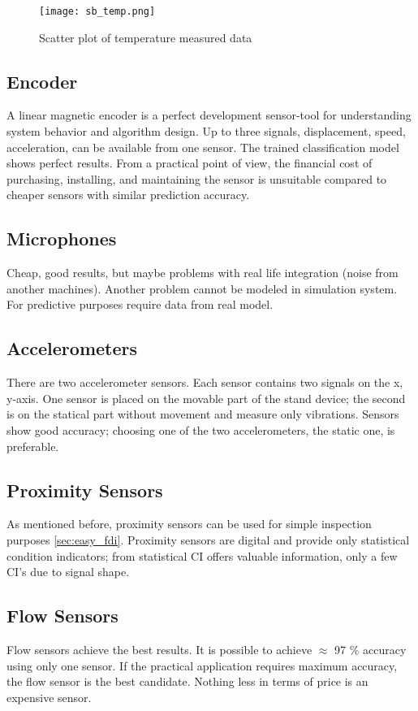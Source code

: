 \begin{figure}[h!]
    \centering
    \texttt{[image: sb\_temp.png]}
    \caption{Scatter plot of temperature measured data}
    \label{fig:temp_scatter}
\end{figure}

\subsection{Encoder}
A linear magnetic encoder is a perfect development sensor-tool for
understanding system behavior and algorithm design. Up to three signals,
displacement, speed, acceleration, can be available from one sensor. The
trained classification model shows perfect results. From a practical point
of view, the financial cost of purchasing, installing, and maintaining the
sensor is unsuitable compared to cheaper sensors with similar prediction
accuracy.

\subsection{Microphones}
Cheap, good results, but maybe problems with real life integration (noise
from another machines). Another problem cannot be modeled in simulation
system. For predictive purposes require data from real model.


\subsection{Accelerometers}
There are two accelerometer sensors. Each sensor contains two signals on
the x, y-axis.  One sensor is placed on the movable part of the stand
device; the second is on the statical part without movement and measure
only vibrations. Sensors show good accuracy; choosing one of the two
accelerometers, the static one, is preferable.

\subsection{Proximity Sensors}
As mentioned before, proximity sensors can be used for simple inspection
purposes \ref{sec:easy_fdi}. Proximity sensors are digital and provide only
statistical condition indicators; from statistical CI offers valuable
information, only a few CI's due to signal shape.

\subsection{Flow Sensors}
Flow sensors achieve the best results. It is possible to achieve $\approx$ 97
\% accuracy using only one sensor. If the practical application requires
maximum accuracy, the flow sensor is the best candidate. Nothing less in
terms of price is an expensive sensor.

